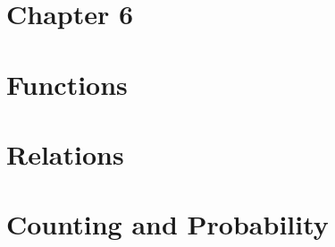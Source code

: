 \documentclass[12pt, letterpaper]{article}
\begin{document}
\section{Chapter 6}

\pagebreak

\section{Functions}




\pagebreak

\section{Relations}

\pagebreak

\section{Counting and Probability}



\end{document}
